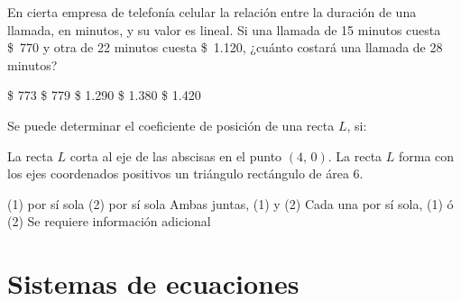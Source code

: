 \documentclass[sin nombre]{srs2}
\begin{document}
\begin{preguntas}
\pregunta
En cierta empresa de telefonía celular la relación entre la duración de una llamada, en minutos, y su valor es lineal. Si una llamada de 15 minutos cuesta \mbox{\$~770} y otra de 22 minutos cuesta \$~1.120, ¿cuánto costará una llamada de 28 minutos?
\begin{alternativas}
\alternativa \$ 773
\alternativa \$ 779
\alternativa \$ 1.290
\alternativa \$ 1.380
\alternativa \$ 1.420
\end{alternativas}

\pregunta Se puede determinar el coeficiente de posición de una recta $L$, si:
\begin{opciones*}
\opcion La recta $L$ corta al eje de las abscisas en el punto $\left(4,\,0\right)$.
\opcion La recta $L$ forma con los ejes coordenados positivos un triángulo rectángulo de área 6.
\end{opciones*}
\begin{alternativas}
\alternativa (1) por sí sola
\alternativa (2) por sí sola
\alternativa Ambas juntas, (1) y (2)
\alternativa Cada una por sí sola, (1) ó (2)
\alternativa Se requiere información adicional
\end{alternativas}
\end{preguntas}

\section{Sistemas de ecuaciones}
\end{document}
